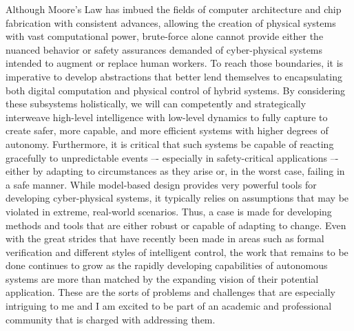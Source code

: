 \documentclass[11pt]{letter}
\begin{document}
  Although Moore's Law has imbued the fields of computer architecture and chip fabrication with consistent advances, allowing the creation of physical systems with vast computational power, brute-force alone cannot provide either the nuanced behavior or safety assurances demanded of cyber-physical systems intended to augment or replace human workers. 
  To reach those boundaries, it is imperative to develop abstractions that better lend themselves to encapsulating both digital computation and physical control of hybrid systems.  By considering these subsystems holistically, we will can competently and strategically interweave high-level intelligence with low-level dynamics to fully capture to create safer, more capable, and more efficient systems with higher degrees of autonomy.  
  Furthermore, it is critical that such systems be capable of reacting gracefully to unpredictable events –- especially in safety-critical applications –- either by adapting to circumstances as they arise or, in the worst case, failing in a safe manner.  While model‑based design provides very powerful tools for developing cyber-physical systems, it typically relies on assumptions that may be violated in extreme, real-world scenarios. Thus, a case is made for developing methods and tools that are either robust or capable of adapting to change. Even with the great strides that have recently been made in areas such as formal verification and different styles of intelligent control, the work that remains to be done continues to grow as the rapidly developing capabilities of autonomous systems are more than matched by the expanding vision of their potential application.  These are the sorts of problems and challenges that are especially intriguing to me and I am excited to be part of an academic and professional community that is charged with addressing them.
\end{document}
